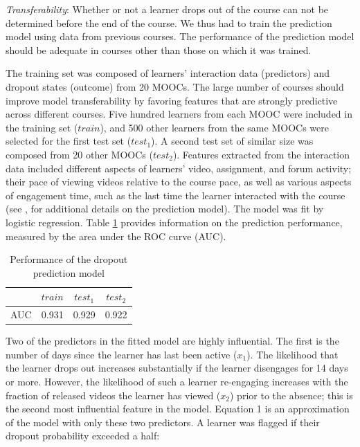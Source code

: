 \documentclass{sigchi}\usepackage[]{graphicx}\usepackage[]{color}
\begin{document}
\textit{Transferability}: Whether or not a learner drops out of the course can not be determined before the end of the course. We thus had to train the prediction model using data from previous courses. The performance of the prediction model should be adequate in courses other than those on which it was trained.

The training set was composed of learners' interaction data (predictors) and dropout states (outcome) from 20 MOOCs. The large number of courses should improve model transferability by favoring features that are strongly predictive across different courses. Five hundred learners from each MOOC were included in the training set ($train$), and 500 other learners from the same MOOCs were selected for the first test set ($test_1$). A second test set of similar size was composed from 20 other MOOCs ($test_2$). Features extracted from the interaction data included different aspects of learners' video, assignment, and forum activity; their pace of viewing videos relative to the course pace, as well as various aspects of engagement time, such as the last time the learner interacted with the course (see \cite{halawa2014dropout}, for additional details on the prediction model). The model was fit by logistic regression. Table \ref{tab:drop_pred_rocs} provides information on the prediction performance, measured by the area under the ROC curve (AUC).

\begin{table}[h!]
\caption{Performance of the dropout prediction model}
\label{tab:drop_pred_rocs}
\small
\center
\begin{tabular}{lccc}
\toprule
 & $train$ & $test_1$ & $test_2$ \\
\midrule
AUC &  0.931 & 0.929 & 0.922  \\
\bottomrule
\end{tabular}
\end{table}

Two of the predictors in the fitted model are highly influential. The first is the number of days since the learner has last been active ($x_{1}$). The likelihood that the learner drops out increases substantially if the learner disengages for 14 days or more. However, the likelihood of such a learner re-engaging increases with the fraction of released videos the learner has viewed ($x_{2}$) prior to the absence; this is the second most influential feature in the model. Equation 1 is an approximation of the model with only these two predictors. A learner was flagged if their dropout probability exceeded a half:
\end{document}
